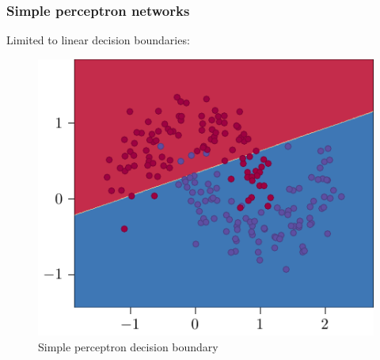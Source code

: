\documentclass{beamer}
\begin{document}
\begin{frame}
    \frametitle{Simple perceptron networks}
    Limited to linear decision boundaries:
    \begin{figure}
        \centering
        \includegraphics[height=0.6\textheight]{figures/linear-boundary/main.pdf}
        \caption{Simple perceptron decision boundary}
    \end{figure}
\end{frame}
\end{document}
